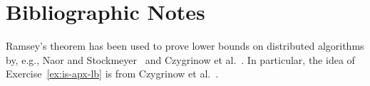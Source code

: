 \section{Bibliographic Notes}

Ramsey's theorem has been used to prove lower bounds on distributed algorithms by, e.g., Naor and Stockmeyer~\cite{naor95what} and Czygrinow et al.~\cite{czygrinow08fast}. In particular, the idea of Exercise~\ref{ex:is-apx-lb} is from Czygrinow et al.~\cite{czygrinow08fast}.
